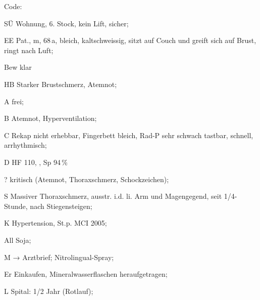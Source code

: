 \documentclass[
ngerman,
paper=a4,
asymmetric,
fontsize=9pt,
draft=false,
parskip=half,
footnotes=multiple,
toc=flat,
]{scrbook}
\newcommand{\ExamProtTypA}[6]{
\cleardoublepage

\addsec{#1}


\begin{WidePar}
{\fontfamily{lmtt}\fontseries{lc}\selectfont#2}
\begin{multicols}{2}
\BoxRoundedBorderFilled{Beige}{Beige}{%
\sffamily\scriptsize\color{Grey}\hrule
0 \hrulefill\par

\mbox{}\hrulefill\par

1 \hrulefill\par

\mbox{}\hrulefill\par

2 \hrulefill\par

\mbox{}\hrulefill\par

3 \hrulefill\par

\mbox{}\hrulefill\par

4 \hrulefill\par

\mbox{}\hrulefill\par

5 \hrulefill\par

\mbox{}\hrulefill\par


6 \hrulefill\par

\mbox{}\hrulefill\par


7 \hrulefill\par

\mbox{}\hrulefill\par


8 \hrulefill\par

\mbox{}\hrulefill\par


9 \hrulefill\par

\mbox{}\hrulefill\par


10 \hrulefill\par

\mbox{}\hrulefill\par

11 \hrulefill\par

\mbox{}\hrulefill\par

12 \hrulefill\par

\mbox{}\hrulefill\par

13 \hrulefill\par

\mbox{}\hrulefill\par

14 \hrulefill\par

\mbox{}\hrulefill\par

15 \hrulefill\par

\mbox{}\hrulefill\par

16 \hrulefill\par

\mbox{}\hrulefill\par

17 \hrulefill\par

\mbox{}\hrulefill\par

18 \hrulefill\par

\mbox{}\hrulefill\par

19 \hrulefill\par

\mbox{}\hrulefill\par




}

\columnbreak
\sffamily\scriptsize

\paragraph{E-Block}

\begin{compactitem}
  \item Szeneüberblick
  \item[GI:]  
  \begin{inparaitem}
    \item Eindruck
    \item Bewußtsein
    \item Hauptbeschwerde
  \end{inparaitem}
  \item Atemweg
  \item B
  \item C
  \item[D:]
  \begin{inparaitem}
    \item HF
    \item RR
    \item TCh1
  \end{inparaitem}
  \item Einschätzung "`kritisch"' begründbar
\end{compactitem}

Bewertung: \colorbox{Beige}{~~~}\,/\,\colorbox{Beige}{~~~}


\paragraph{Wichtige Punkte}~\par
#3


Bewertung: \colorbox{Beige}{~~~}\,/\,\colorbox{Beige}{~~~}

\paragraph{Relevante Punkte}~\par
#4

Bewertung: \colorbox{Beige}{~~~}\,/\,\colorbox{Beige}{~~~}



\paragraph{Muss-/KO-Punkte}~\par
#6

KO: Patientengefährung

\paragraph{Bewertung Qualität} nach Globalskala

Q: \colorbox{Beige}{~~~}\,/\,5

\paragraph{Bewertung Reihenfolge} nach Globalskala

R: \colorbox{Beige}{~~~}\,/\,5 

\normalsize ~
\end{multicols}
\sffamily
\begin{tabulary}{\linewidth}{ccccccc}
\toprule
E-Block & Wi. M & Rel. M & Qualität & Reihenfolge & ~ & Summe
\\\midrule
(2x \colorbox{Beige}{~~~}\,/\,\colorbox{Beige}{~~~}~+
&
3x \colorbox{Beige}{~~~}\,/\,\colorbox{Beige}{~~~}~+ 
& 
2x \colorbox{Beige}{~~~}\,/\,\colorbox{Beige}{~~~}~+\,/\,\colorbox{Beige}{~~~}~+ 
& 
\colorbox{Beige}{~~~}\,/\,5 
& 
2x \colorbox{Beige}{~~~}\,/\,5~+ 
& 
)\,/\,9~= 
& 
\colorbox{Beige}{~~~}
\\\bottomrule
\end{tabulary}



\end{WidePar}

}
\begin{document}
{%
Code:  

\begin{inparadesc}
  \item[SÜ] Wohnung, 6. Stock, kein Lift, sicher;
  \item[EE] Pat., m, 68\,a, bleich, kaltschweissig, sitzt auf Couch und greift sich auf Brust, ringt nach Luft;
  \item[Bew] klar
  \item[HB] Starker Brustschmerz, Atemnot;
  \item[A] frei;
  \item[B] Atemnot, Hyperventilation;
  \item[C] Rekap nicht erhebbar, Fingerbett bleich, Rad-P sehr schwach tastbar, schnell, arrhythmisch;
  \item[D] HF 110, , Sp 94\,\%
  \item[?] kritisch (Atemnot, Thoraxschmerz, Schockzeichen);
\end{inparadesc}

\begin{inparadesc}
  \item[S] Massiver Thoraxschmerz, ausstr. i.d. li. Arm und Magengegend, seit 1/4-Stunde, nach Stiegensteigen;
  \item[K] Hypertension, St.p. MCI 2005;
  \item[All] Soja;
  \item[M] → Arztbrief; Nitrolingual-Spray;
  \item[Er] Einkaufen, Mineralwasserflaschen heraufgetragen;
  \item[L] Spital: 1/2 Jahr (Rotlauf); 
\end{inparadesc}

}
\end{document}
